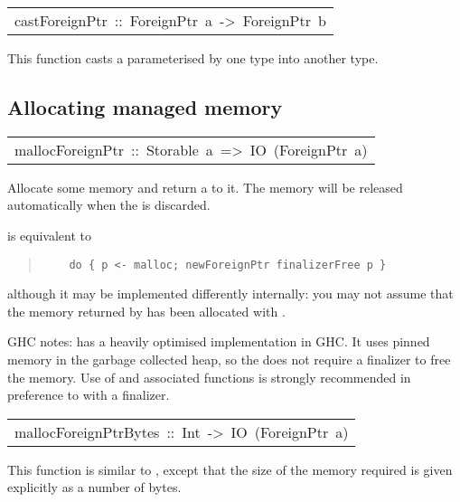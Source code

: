 \begin{haddockdesc}
\item[\begin{tabular}{@{}l}
castForeignPtr\ ::\ ForeignPtr\ a\ ->\ ForeignPtr\ b
\end{tabular}]\haddockbegindoc
This function casts a 
 parameterised by one type into another type.
\par

\end{haddockdesc}
\subsection{Allocating managed memory
}
\begin{haddockdesc}
\item[\begin{tabular}{@{}l}
mallocForeignPtr\ ::\ Storable\ a\ =>\ IO\ (ForeignPtr\ a)
\end{tabular}]\haddockbegindoc
Allocate some memory and return a  to it.  The memory
 will be released automatically when the  is discarded.
\par
{} is equivalent to
\par
\begin{quote}
{\haddockverb\begin{verbatim}
    do { p <- malloc; newForeignPtr finalizerFree p }
\end{verbatim}}
\end{quote}
although it may be implemented differently internally: you may not
 assume that the memory returned by  has been
 allocated with .
\par
GHC notes:  has a heavily optimised
 implementation in GHC.  It uses pinned memory in the garbage
 collected heap, so the  does not require a finalizer to
 free the memory.  Use of  and associated
 functions is strongly recommended in preference to 
 with a finalizer.
\par

\end{haddockdesc}
\begin{haddockdesc}
\item[\begin{tabular}{@{}l}
mallocForeignPtrBytes\ ::\ Int\ ->\ IO\ (ForeignPtr\ a)
\end{tabular}]\haddockbegindoc
This function is similar to , except that the
 size of the memory required is given explicitly as a number of bytes.
\par

\end{haddockdesc}
